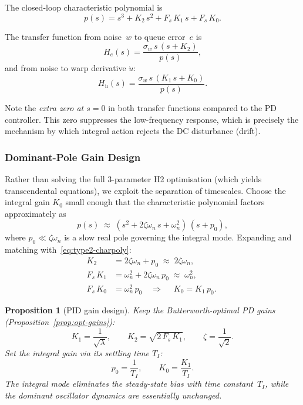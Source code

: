 \documentclass[11pt, a4paper]{article}
\theoremstyle{definition}
\theoremstyle{plain}
\newtheorem{proposition}[theorem]{Proposition}
\theoremstyle{remark}
\begin{document}
The closed-loop characteristic polynomial is
\begin{equation}\label{eq:type2-charpoly}
  p(s) = s^3 + K_2\,s^2 + F_s\,K_1\,s + F_s\,K_0.
\end{equation}

The transfer function from noise~$w$ to queue error~$e$ is
\begin{equation}\label{eq:type2-He}
  H_e(s) = \frac{\sigma_w\,s\,(s + K_2)}{p(s)},
\end{equation}
and from noise to warp derivative $\dot{u}$:
\begin{equation}\label{eq:type2-Hu}
  H_{\dot{u}}(s) = \frac{\sigma_w\,s\,(K_1\,s + K_0)}{p(s)}.
\end{equation}

Note the \emph{extra zero at $s = 0$} in both transfer functions
compared to the PD controller.  This zero suppresses the
low-frequency response, which is precisely the mechanism by
which integral action rejects the DC disturbance (drift).

\subsubsection{Dominant-Pole Gain Design}\label{sec:dominant-pole}

Rather than solving the full 3-parameter H2 optimisation (which
yields transcendental equations), we exploit the separation of
timescales.  Choose the integral gain $K_0$ small enough that the
characteristic polynomial factors approximately as
\begin{equation}\label{eq:dominant-factor}
  p(s) \;\approx\; (s^2 + 2\zeta\omega_n\,s + \omega_n^2)\,(s + p_0),
\end{equation}
where $p_0 \ll \zeta\omega_n$ is a slow real pole governing the
integral mode.  Expanding and matching
with~\eqref{eq:type2-charpoly}:
\begin{align}
  K_2 &= 2\zeta\omega_n + p_0 \;\approx\; 2\zeta\omega_n,
    \label{eq:K2-pid}\\
  F_s\,K_1 &= \omega_n^2 + 2\zeta\omega_n\,p_0
    \;\approx\; \omega_n^2,
    \label{eq:K1-pid}\\
  F_s\,K_0 &= \omega_n^2\,p_0
    \quad\Longrightarrow\quad
    \boxed{\;K_0 = K_1\,p_0.\;}
    \label{eq:K0-pid}
\end{align}

\begin{proposition}[PID gain design]\label{prop:pid-gains}
  Keep the Butterworth-optimal PD gains
  (Proposition~\ref{prop:opt-gains}):
  \begin{equation}
    K_1 = \frac{1}{\sqrt{\lambda}},\qquad
    K_2 = \sqrt{2\,F_s\,K_1},\qquad
    \zeta = \frac{1}{\sqrt{2}}.
  \end{equation}
  Set the integral gain via its settling time $T_I$:
  \begin{equation}\label{eq:K0-from-TI}
    p_0 = \frac{1}{T_I},\qquad
    K_0 = \frac{K_1}{T_I}.
  \end{equation}
  The integral mode eliminates the steady-state bias with time
  constant~$T_I$, while the dominant oscillator dynamics are
  essentially unchanged.
\end{proposition}
\end{document}
